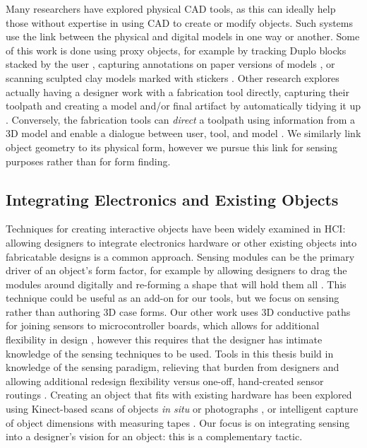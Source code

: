     Many researchers have explored physical CAD tools, as this can ideally help those without expertise in using CAD to create or modify objects. Such systems use the link between the physical and digital models in one way or another. Some of this work is done using proxy objects, for example by tracking Duplo blocks stacked by the user \cite{gupta-duplotrack}, capturing annotations on paper versions of models \cite{song-modelcraft-tochi}, or scanning sculpted clay models marked with stickers \cite{savage-mmarks}. Other research explores actually having a designer work with a fabrication tool directly, capturing their toolpath and creating a model and/or final artifact by automatically tidying it up \cite{willis-interactive, mueller-constructable, mueller-laserorigami}. Conversely, the fabrication tools can \emph{direct} a toolpath using information from a 3D model and enable a dialogue between user, tool, and model \cite{zoran-freed}. We similarly link object geometry to its physical form, however we pursue this link for sensing purposes rather than for form finding.

    \subsection{Integrating Electronics and Existing Objects}

    Techniques for creating interactive objects have been widely examined in HCI: allowing designers to integrate electronics hardware or other existing objects into fabricatable designs is a common approach. Sensing modules can be the primary driver of an object's form factor, for example by allowing designers to drag the modules around digitally and re-forming a shape that will hold them all \cite{weichel-enclosed,villar-gadgeteer}. This technique could be useful as an add-on for our tools, but we focus on sensing rather than authoring 3D case forms. Our other work uses 3D conductive paths for joining sensors to microcontroller boards, which allows for additional flexibility in design \cite{savage-sot}, however this requires that the designer has intimate knowledge of the sensing techniques to be used. Tools in this thesis build in knowledge of the sensing paradigm, relieving that burden from designers and allowing additional redesign flexibility versus one-off, hand-created sensor routings \cite{navarrette-gps, park-microchannels}. Creating an object that fits with existing hardware has been explored using Kinect-based scans of objects \emph{in situ} \cite{molyneaux-kinectfusion, weichel-mixfab} or photographs \cite{lau-modeling}, or intelligent capture of object dimensions with measuring tapes \cite{lee-handscape,weichel-spata}. Our focus is on integrating sensing into a designer's vision for an object: this is a complementary tactic.

